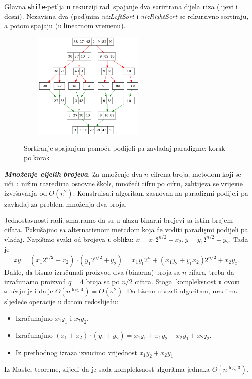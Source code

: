 Glavna \texttt{while}-petlja u rekurziji radi spajanje dva sorirtrana dijela niza (lijevi i desni). Nezavisna dva (pod)niza \textit{nizLeftSort} i \textit{nizRightSort} se rekurzivno sortiraju, a potom spajaju (u linearnom vremenu).

 \begin{figure}
 	\centering
 	\includegraphics[width=200pt,height=150pt]{slike/mege.png} %
 	\label{fig:merge-sort}
 	\caption{Sortiranje spajanjem pomoću podijeli pa zavladaj paradigme: korak po korak}
 \end{figure}

\begin{example}

\textbf{\textit{Množenje cijelih brojeva}}. Za  množenje dva $n$-cifrena broja, metodom koji se uči u nižim razredima osnovne škole, množeći cifru po cifru, zahtijeva se vrijeme izvršavanja od $O(n^2)$.  Konstruisati algoritam zasnovan na paradigmi podijeli pa zavladaj za problem množenja dva broja. 
\end{example}
\begin{solution}
 
 
 Jednostavnosti radi, smatramo da su u ulazu binarni brojevi sa istim brojem cifara.
Pokušajmo sa alternativnom metodom koja će voditi paradigmi podijeli pa vladaj.  Napišimo svaki od brojeva u obliku: $x= x_1 2^{n/2} + x_2, y= y_1 2^{n/2} + y_2$.
Tada je 
$$ xy = (x_1 2^{n/2} + x_2) \cdot (y_1 2^{n/2} + y_2) = x_1 y_1 2^n + (x_1 y_2 + y_1 x_2)2^{n/2} + x_2y_2.$$
Dakle, da bismo izračunali proizvod dva (binarna) broja sa $n$ cifara, treba da izračunamo proizvod $q=4$ broja sa po $n/2$ cifara. Stoga, kompleksnost u ovom slučaju je i dalje $O(n^{\log_2 4}) = O(n^2)$. Da bismo ubrzali algoritam,   uradimo sljedeće operacije u datom redoslijedu:
\begin{itemize}
	\item Izračunajmo $x_1y_1$ i $x_2 y_2$.
	\item Izračunajmo $(x_1 + x_2 ) \cdot (y_1 + y_2) = x_1y_1 + x_1y_2 + x_2 y_1 + x_2 y_2$.
	\item Iz prethodnog izraza izvucimo vrijednost $x_1 y_2 + x_2 y_1$.
\end{itemize}
Iz Master teoreme, slijedi da je sada kompleksnost algoritma jednaka $O(n^{\log_2 3})$.
\end{solution}

